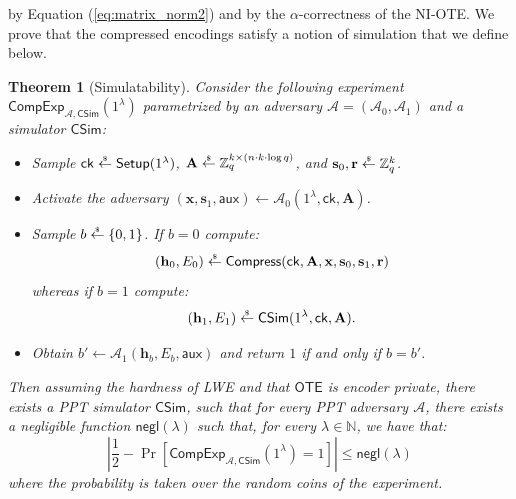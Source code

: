 \documentclass{article}
\newtheorem{theorem}{Theorem}\newtheorem{lemma}[theorem]{Lemma}\newtheorem{proposition}[theorem]{Proposition}\newtheorem{corollary}[theorem]{Corollary}\newtheorem{definition}[theorem]{Definition}\newtheorem{claim}[theorem]{Claim}
\newcommand{\getsr}{\overset{\raisebox{-1pt}{$\scriptscriptstyle \$$}}{\gets}}
\newcommand{\sample}{\getsr}
\newcommand{\OTE}{\mathsf{OTE}}
\newcommand{\N}{\mathbb{N}}
\newcommand{\Z}{\mathbb{Z}}
\newcommand{\negl}{\mathsf{negl}}
\renewcommand{\sec}{\ensuremath{\lambda}}
\newcommand{\aux}{\mathsf{aux}}
\newcommand{\Sim}{\mathsf{Sim}}
\newcommand{\Adv}{\mathcal{A}}
\newcommand{\Compress}{\mathsf{Compress}}
\newcommand{\ck}{\mathsf{ck}}
\newcommand{\algofont}[1]{\ensuremath{\mathsf{#1}}}
\newcommand{\Setup}{{\algofont{Setup}}}
\newcommand{\thmlab}[1]{\label{thm:#1}}
\newcommand\bbbone{1}
\begin{document}
by Equation (\ref{eq:matrix_norm2}) and by the $\alpha$-correctness of the NI-OTE.
We prove that the compressed encodings satisfy a notion of simulation that we define below.
\begin{theorem}[Simulatability]\thmlab{expansion}
Consider the following experiment $\mathsf{CompExp}_{\mathcal{A}, \mathsf{C}\Sim}(\bbbone^\sec)$ parametrized by an adversary $\mathcal{A} = (\mathcal{A}_0, \mathcal{A}_1)$ and a simulator $\mathsf{C}\Sim$:
\begin{itemize}
\item Sample $\ck\sample\Setup(\bbbone^\sec)$, $\mathbf{A}\sample\Z_q^{k\times (n\cdot k\cdot \log q)}$, and $\mathbf{s}_0, \mathbf{r}\sample\Z_q^k$.
\item Activate the adversary $(\mathbf{x}, \mathbf{s}_1, \aux)\gets\Adv_0(\bbbone^\sec, \ck, \mathbf{A})$.
\item Sample $b\sample\{0, 1\}$. If $b = 0$ compute:
\[
(\mathbf{h}_0, E_0)\sample\Compress(\ck, \mathbf{A}, \mathbf{x}, \mathbf{s}_0, \mathbf{s}_1, \mathbf{r})
\]
whereas if $b=1$ compute:
\[
(\mathbf{h}_1, E_1)\sample\mathsf{C}\Sim(\bbbone^\sec, \ck, \mathbf{A}).
\]
\item Obtain $b' \gets \Adv_1(\mathbf{h}_b, E_b, \aux)$ and return $1$ if and only if $b=b'$.
\end{itemize}
Then assuming the hardness of LWE and that $\OTE$ is encoder private, there exists a PPT simulator $\mathsf{C}\Sim$, such that for every PPT adversary $\mathcal{A}$, there exists a negligible function $\negl(\sec)$ such that, for every $\sec\in\N$, we have that:
\[
\left|\frac{1}{2} - \Pr\left[\mathsf{CompExp}_{\mathcal{A}, \mathsf{C}\Sim}(\bbbone^\sec) = 1\right] \right|\le\negl(\sec)
\]
where the probability is taken over the random coins of the experiment.
\end{theorem}
\end{document}
